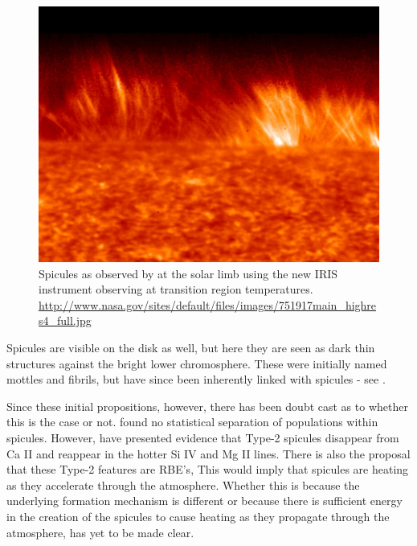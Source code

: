 \begin{figure}
	\centering
	\includegraphics[scale=0.4]{Chapter2/Figs/spicules_at_limb}
	\caption{Spicules as observed by at the solar limb using the new IRIS instrument observing at transition region temperatures.
		\url{http://www.nasa.gov/sites/default/files/images/751917main_highres4_full.jpg}}
\end{figure}

Spicules are visible on the disk as well, but here they are seen as dark thin structures against the bright lower chromosphere.
These were initially named mottles and fibrils, but have since been inherently linked with spicules - see \cite{DePontieu2007MF, Rouppe2009}.

Since these initial propositions, however, there has been doubt cast as to whether this is the case or not. 
\cite{Zhang2012} found no statistical separation of populations within spicules.
However, \cite{Pereira2014} have presented evidence that Type-2 spicules disappear from Ca II and reappear in the hotter Si IV and Mg II lines.
There is also the proposal that these Type-2 features are RBE's, \cite{Kuridze2015, Rouppe2015}
This would imply that spicules are heating as they accelerate through the atmosphere.
Whether this is because the underlying formation mechanism is different or because there is sufficient energy in the creation of the spicules to cause heating as they propagate through the atmosphere, has yet to be made clear. 

